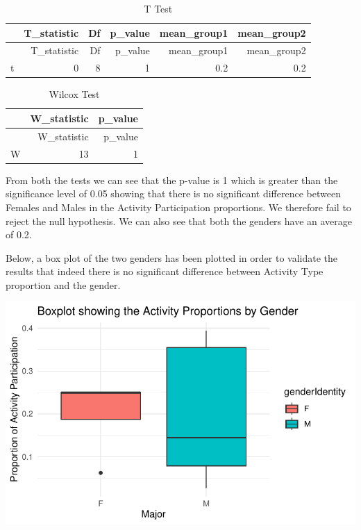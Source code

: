 \documentclass[
  letterpaper,
  DIV=11,
  numbers=noendperiod]{scrartcl}
\begin{document}
\begin{longtable}[]{@{}lrrrrr@{}}
\caption{T Test}\tabularnewline
\toprule\noalign{}
& T\_statistic & Df & p\_value & mean\_group1 & mean\_group2 \\
\midrule\noalign{}
\endfirsthead
\toprule\noalign{}
& T\_statistic & Df & p\_value & mean\_group1 & mean\_group2 \\
\midrule\noalign{}
\endhead
\bottomrule\noalign{}
\endlastfoot
t & 0 & 8 & 1 & 0.2 & 0.2 \\
\end{longtable}

\begin{longtable}[]{@{}lrr@{}}
\caption{Wilcox Test}\tabularnewline
\toprule\noalign{}
& W\_statistic & p\_value \\
\midrule\noalign{}
\endfirsthead
\toprule\noalign{}
& W\_statistic & p\_value \\
\midrule\noalign{}
\endhead
\bottomrule\noalign{}
\endlastfoot
W & 13 & 1 \\
\end{longtable}

From both the tests we can see that the p-value is 1 which is greater
than the significance level of 0.05 showing that there is no significant
difference between Females and Males in the Activity Participation
proportions. We therefore fail to reject the null hypothesis. We can
also see that both the genders have an average of 0.2.

Below, a box plot of the two genders has been plotted in order to
validate the results that indeed there is no significant difference
between Activity Type proportion and the gender.

\includegraphics{technical_report_files/figure-pdf/r10-1.pdf}
\end{document}
